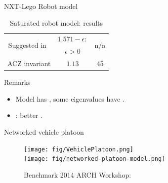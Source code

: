 \begin{frame}{NXT-Lego Robot model}
{\begin{minipage}{0.48\textwidth}
\begin{table}
{\begin{tabular}{|l|c|c|c|}
\hline
\multicolumn{2}{|c|}{\multirow{2}{*}{Suggested in~\cite{heinz2014benchmark}}} &
$1.571-\epsilon:$ & \multirow{2}{*}{n/a}\\
\multicolumn{2}{|c|}{} & $\epsilon>0$ &\\
\hline
\multicolumn{2}{|c|}{\multirow{2}{*}{ACZ invariant}} & \multirow{2}{*}{$1.13$} &
\multirow{2}{*}{45}\\
\multicolumn{2}{|c|}{} & &\\
\hline
\end{tabular}
}
\caption*{{\footnotesize Saturated robot model: results}}
\end{table}
\end{minipage}
}
\vspace{-2em}
{\small
\begin{alertblock}{Remarks}
\begin{itemize}
\item Model has , some eigenvalues have .
\item {}: better .
\end{itemize}
\end{alertblock}
}
\end{frame}


\begin{frame}{Networked vehicle platoon}
\begin{figure}
\caption*{\small Benchmark {\color{blue}  2014 ARCH Workshop}: }
\texttt{[image: fig/VehiclePlatoon.png]}\\
\texttt{[image: fig/networked-platoon-model.png]}
\end{figure}
\end{frame}


